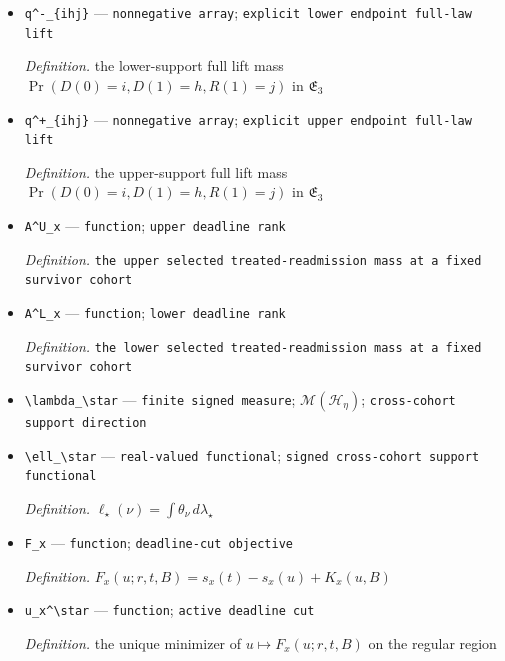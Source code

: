 \documentclass{article}
\begin{document}
\begin{itemize}
  \item \texttt{q\textasciicircum{}-\allowbreak{}\_\allowbreak{}\{ihj\}\allowbreak{}} --- \texttt{nonnegative array}; \texttt{explicit lower endpoint full-\allowbreak{}law lift}
  \par\smallskip\noindent\emph{Definition.} the lower-support full lift mass \(\Pr(D(0)=i,D(1)=h,R(1)=j)\) in \(\mathfrak E_3\)
  \item \texttt{q\textasciicircum{}+\allowbreak{}\_\allowbreak{}\{ihj\}\allowbreak{}} --- \texttt{nonnegative array}; \texttt{explicit upper endpoint full-\allowbreak{}law lift}
  \par\smallskip\noindent\emph{Definition.} the upper-support full lift mass \(\Pr(D(0)=i,D(1)=h,R(1)=j)\) in \(\mathfrak E_3\)
  \item \texttt{A\textasciicircum{}U\_\allowbreak{}x} --- \texttt{function}; \texttt{upper deadline rank}
  \par\smallskip\noindent\emph{Definition.} \texttt{the upper selected treated-\allowbreak{}readmission mass at a fixed survivor cohort}
  \item \texttt{A\textasciicircum{}L\_\allowbreak{}x} --- \texttt{function}; \texttt{lower deadline rank}
  \par\smallskip\noindent\emph{Definition.} \texttt{the lower selected treated-\allowbreak{}readmission mass at a fixed survivor cohort}
  \item \texttt{\textbackslash{}\allowbreak{}lambda\_\allowbreak{}\textbackslash{}\allowbreak{}star} --- \texttt{finite signed measure}; \(\mathcal M(\mathcal H_\eta)\); \texttt{cross-\allowbreak{}cohort support direction}
  \item \texttt{\textbackslash{}\allowbreak{}ell\_\allowbreak{}\textbackslash{}\allowbreak{}star} --- \texttt{real-\allowbreak{}valued functional}; \texttt{signed cross-\allowbreak{}cohort support functional}
  \par\smallskip\noindent\emph{Definition.} \(\ell_\star(\nu)=\int\theta_\nu\,d\lambda_\star\)
  \item \texttt{F\_\allowbreak{}x} --- \texttt{function}; \texttt{deadline-\allowbreak{}cut objective}
  \par\smallskip\noindent\emph{Definition.} \(F_x(u;r,t,B)=s_x(t)-s_x(u)+K_x(u,B)\)
  \item \texttt{u\_\allowbreak{}x\textasciicircum{}\textbackslash{}\allowbreak{}star} --- \texttt{function}; \texttt{active deadline cut}
  \par\smallskip\noindent\emph{Definition.} the unique minimizer of \(u\mapsto F_x(u;r,t,B)\) on the regular region

\end{itemize}
\end{document}
